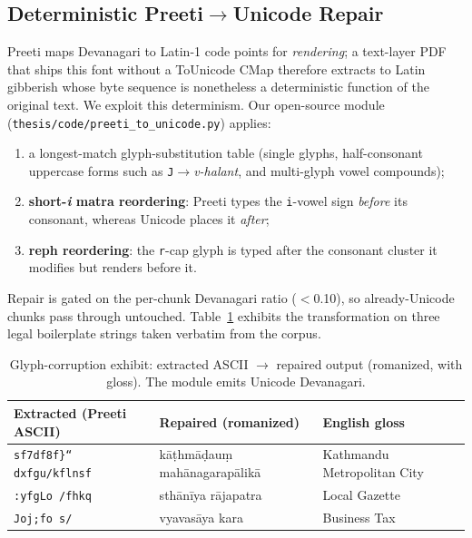 \documentclass[conference]{IEEEtran}
\providecommand{\dev}[1]{\textit{#1}}
\begin{document}
\subsection{Deterministic Preeti$\rightarrow$Unicode Repair}
\label{sec:repair}
Preeti maps Devanagari to Latin-1 code points for \emph{rendering}; a text-layer PDF that ships this font without a ToUnicode CMap therefore extracts to Latin gibberish whose byte sequence is nonetheless a deterministic function of the original text. We exploit this determinism. Our open-source module (\texttt{thesis/code/preeti\_to\_unicode.py}) applies:
\begin{enumerate}
  \item a longest-match glyph-substitution table (single glyphs, half-consonant uppercase forms such as \texttt{J}$\rightarrow$\dev{v-halant}, and multi-glyph vowel compounds);
  \item \textbf{short-\emph{i} matra reordering}: Preeti types the \texttt{i}-vowel sign \emph{before} its consonant, whereas Unicode places it \emph{after};
  \item \textbf{reph reordering}: the \texttt{r}-cap glyph is typed after the consonant cluster it modifies but renders before it.
\end{enumerate}
Repair is gated on the per-chunk Devanagari ratio ($<$0.10), so already-Unicode chunks pass through untouched. Table~\ref{tab:exhibit} exhibits the transformation on three legal boilerplate strings taken verbatim from the corpus.

\begin{table}[t]
\caption{Glyph-corruption exhibit: extracted ASCII $\rightarrow$ repaired output (romanized, with gloss). The module emits Unicode Devanagari.}
\label{tab:exhibit}
\centering
\footnotesize
\begin{tabular}{p{2.3cm}p{2.1cm}p{2.5cm}}
\toprule
\textbf{Extracted (Preeti ASCII)} & \textbf{Repaired (romanized)} & \textbf{English gloss} \\
\midrule
\texttt{sf7df8f\}“ dxfgu/kflnsf} & k\=a\d{t}hm\=a\d{d}au\d{m} mah\=anagarap\=alik\=a & Kathmandu Metropolitan City \\
\texttt{:yfgLo /fhkq} & sth\=an\=iya r\=ajapatra & Local Gazette \\
\texttt{Joj;fo s/} & vyavas\=aya kara & Business Tax \\
\bottomrule
\end{tabular}
\end{table}
\end{document}
